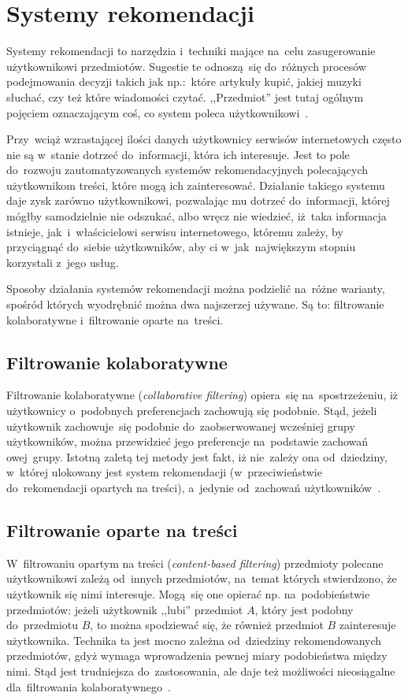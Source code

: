 \documentclass[pl]{minipw} %
\begin{document}
\section{Systemy rekomendacji}

Systemy rekomendacji to narzędzia i~techniki mające na~celu zasugerowanie użytkownikowi przedmiotów. Sugestie te odnoszą~się do~różnych procesów podejmowania decyzji takich jak np.:~które artykuły kupić, jakiej muzyki słuchać, czy też które wiadomości czytać. ,,Przedmiot'' jest tutaj ogólnym pojęciem oznaczającym coś, co system poleca użytkownikowi~\cite{handbook}. 

Przy~wciąż wzrastającej ilości danych użytkownicy serwisów internetowych często nie są w~stanie dotrzeć do~informacji, która ich interesuje. Jest to pole do~rozwoju zautomatyzowanych systemów rekomendacyjnych polecających użytkownikom treści, które mogą ich zainteresować. Działanie takiego systemu daje zysk zarówno użytkownikowi, pozwalając mu dotrzeć do~informacji, której mógłby samodzielnie nie odszukać, albo wręcz nie wiedzieć, iż~taka informacja istnieje, jak~i~właścicielowi serwisu internetowego, któremu zależy, by przyciągnąć do~siebie użytkowników, aby ci w~jak~największym stopniu korzystali z~jego usług.

Sposoby działania systemów rekomendacji można podzielić na~różne warianty, spośród których wyodrębnić można dwa najszerzej używane. Są to: filtrowanie kolaboratywne i~filtrowanie oparte na~treści.

\subsection{Filtrowanie kolaboratywne}
Filtrowanie kolaboratywne (\textit{collaborative filtering}) opiera~się na~spostrzeżeniu, iż użytkownicy o~podobnych preferencjach zachowują się podobnie. Stąd, jeżeli użytkownik zachowuje~się podobnie do~zaobserwowanej wcześniej grupy użytkowników, można przewidzieć jego preferencje na~podstawie zachowań owej~grupy. Istotną zaletą tej metody jest fakt, iż nie~zależy ona od~dziedziny, w~której ulokowany jest system rekomendacji (w~przeciwieństwie do~rekomendacji opartych na treści), a~jedynie od~zachowań użytkowników~\cite{handbook_col}.
\subsection{Filtrowanie oparte na treści}
W~filtrowaniu opartym na treści (\textit{content-based filtering}) przedmioty polecane użytkownikowi zależą od~innych przedmiotów, na~temat których stwierdzono, że użytkownik się nimi interesuje. Mogą~się one opierać np. na~podobieństwie przedmiotów: jeżeli użytkownik ,,lubi'' przedmiot $A$, który jest podobny do~przedmiotu $B$, to można spodziewać się, że również przedmiot $B$ zainteresuje użytkownika. Technika ta jest mocno zależna od~dziedziny rekomendowanych przedmiotów, gdyż wymaga wprowadzenia pewnej miary podobieństwa między nimi. Stąd jest trudniejsza do~zastosowania, ale daje też możliwości nieosiągalne dla~filtrowania kolaboratywnego~\cite{handbook_cb}.
\end{document}
